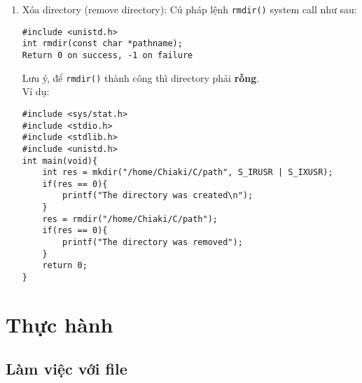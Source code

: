 \documentclass{article}
\begin{document}
\begin{enumerate}
\begin{enumerate}
\begin{verbatim}
int main(void){
    if(mkdir("/home/Chiaki/C",0755)==-1){
        perror("mkdir");
        exit(EXIT_FAILURE);
    }
    printf("Directory created successfully!\n");
    return 0;
}

\end{verbatim}
\end{enumerate}
\item Xóa directory (remove directory): Cú pháp lệnh \verb|rmdir()| system call như sau:
\begin{verbatim}
#include <unistd.h>
int rmdir(const char *pathname);
Return 0 on success, -1 on failure
\end{verbatim}
Lưu ý, để \verb|rmdir()| thành công thì directory phải \textbf{rỗng}. \\ Ví dụ:
\begin{verbatim}
#include <sys/stat.h>
#include <stdio.h>
#include <stdlib.h>
#include <unistd.h>
int main(void){
    int res = mkdir("/home/Chiaki/C/path", S_IRUSR | S_IXUSR);
    if(res == 0){
        printf("The directory was created\n");
    }
    res = rmdir("/home/Chiaki/C/path");
    if(res == 0){
        printf("The directory was removed");
    }
    return 0;
}
\end{verbatim}
    \end{enumerate}
\section{Thực hành}
\subsection{Làm việc với file}
\end{document}
